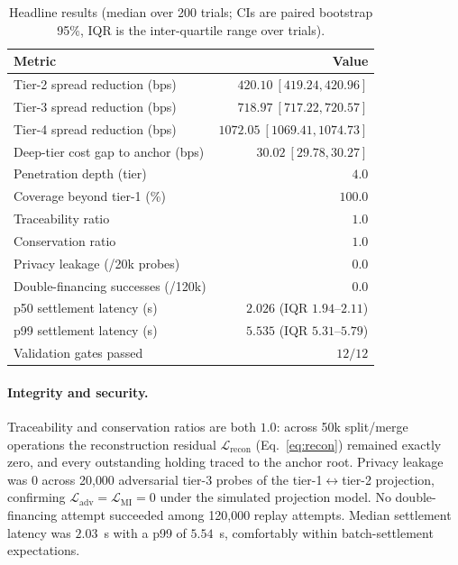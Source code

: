 \documentclass[10pt,twocolumn,letterpaper]{article}
\begin{document}
\begin{table}[h]
\centering
\caption{Headline results (median over 200 trials; CIs are paired bootstrap 95\%,
IQR is the inter-quartile range over trials).}
\label{tab:results}
\small
\begin{tabular}{@{}lr@{}}
\toprule
\textbf{Metric} & \textbf{Value} \\
\midrule
Tier-2 spread reduction (bps)        & $420.10\ [419.24,420.96]$ \\
Tier-3 spread reduction (bps)        & $718.97\ [717.22,720.57]$ \\
Tier-4 spread reduction (bps)        & $1072.05\ [1069.41,1074.73]$ \\
Deep-tier cost gap to anchor (bps)   & $30.02\ [29.78,30.27]$ \\
Penetration depth (tier)             & $4.0$ \\
Coverage beyond tier-1 (\%)          & $100.0$ \\
Traceability ratio                   & $1.0$ \\
Conservation ratio                   & $1.0$ \\
Privacy leakage (/20k probes)        & $0.0$ \\
Double-financing successes (/120k)   & $0.0$ \\
p50 settlement latency (s)           & $2.026$ (IQR $1.94$--$2.11$) \\
p99 settlement latency (s)           & $5.535$ (IQR $5.31$--$5.79$) \\
Validation gates passed              & $12/12$ \\
\bottomrule
\end{tabular}
\end{table}

\paragraph{Integrity and security.} Traceability and conservation ratios are both
$1.0$: across 50k split/merge operations the reconstruction residual
$\mathcal{L}_{\mathrm{recon}}$ (Eq.~\ref{eq:recon}) remained exactly zero, and every
outstanding holding traced to the anchor root. Privacy leakage was $0$ across 20{,}000
adversarial tier-3 probes of the tier-1$\leftrightarrow$tier-2 projection, confirming
$\mathcal{L}_{\mathrm{adv}}=\mathcal{L}_{\mathrm{MI}}=0$ under the simulated projection
model. No double-financing attempt succeeded among 120{,}000 replay attempts. Median
settlement latency was $2.03$~s with a p99 of $5.54$~s, comfortably within
batch-settlement expectations.
\end{document}
